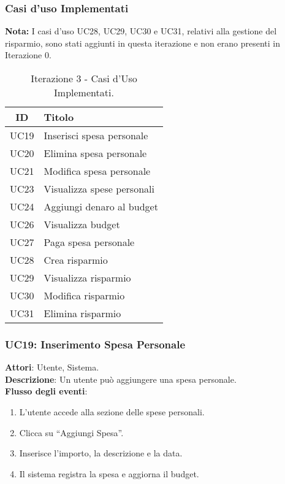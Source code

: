\subsubsection{Casi d'uso Implementati}

\textbf{Nota:} I casi d’uso UC28, UC29, UC30 e UC31, relativi alla gestione del risparmio,
sono stati aggiunti in questa iterazione e non erano presenti in Iterazione 0.

\begin{table}[h]
    \centering
    \begin{tabular}{|c|l|}
    \hline
    \textbf{ID} & \textbf{Titolo} \\ \hline
    UC19 & Inserisci spesa personale \\ \hline
    UC20 & Elimina spesa personale \\ \hline
    UC21 & Modifica spesa personale \\ \hline
    UC23 & Visualizza spese personali \\ \hline
    UC24 & Aggiungi denaro al budget \\ \hline
    UC26 & Visualizza budget \\ \hline
    UC27 & Paga spesa personale \\ \hline
    UC28 & Crea risparmio \\ \hline
    UC29 & Visualizza risparmio \\ \hline
    UC30 & Modifica risparmio \\ \hline
    UC31 & Elimina risparmio \\ \hline
    \end{tabular}
    \caption{Iterazione 3 - Casi d’Uso Implementati.}
\end{table}

\subsubsection{UC19: Inserimento Spesa Personale}
\textbf{Attori}: Utente, Sistema. \\
\textbf{Descrizione}: Un utente può aggiungere una spesa personale. \\
\textbf{Flusso degli eventi}:
\begin{enumerate}
    \item L’utente accede alla sezione delle spese personali.
    \item Clicca su ``Aggiungi Spesa''.
    \item Inserisce l’importo, la descrizione e la data.
    \item Il sistema registra la spesa e aggiorna il budget.
\end{enumerate}

